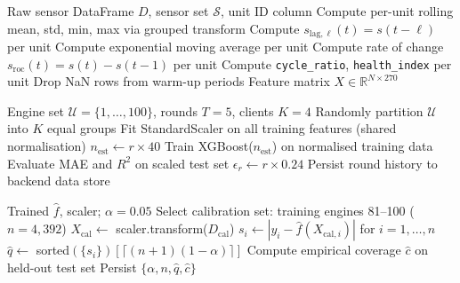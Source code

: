 \documentclass[10pt, journal, letterpaper]{IEEEtran}
\begin{document}
\begin{algorithm}[H]
\caption{Feature Engineering Pipeline}
\begin{algorithmic}[1]
\REQUIRE Raw sensor DataFrame $D$, sensor set $\mathcal{S}$, unit ID column
    \STATE Compute per-unit rolling mean, std, min, max via grouped transform
  \ENDFOR
    \STATE Compute $s_{\mathrm{lag},\ell}(t) = s(t-\ell)$ per unit
  \ENDFOR
    \STATE Compute exponential moving average per unit
  \ENDFOR
  \STATE Compute rate of change $s_\mathrm{roc}(t) = s(t)-s(t-1)$ per unit
\ENDFOR
\STATE Compute \texttt{cycle\_ratio}, \texttt{health\_index} per unit
\STATE Drop NaN rows from warm-up periods
\RETURN Feature matrix $X \in \mathbb{R}^{N \times 270}$
\end{algorithmic}
\end{algorithm}

\begin{algorithm}[H]
\caption{Federated Training Simulation}
\begin{algorithmic}[1]
\REQUIRE Engine set $\mathcal{U}=\{1,\ldots,100\}$, rounds $T=5$, clients $K=4$
\STATE Randomly partition $\mathcal{U}$ into $K$ equal groups
\STATE Fit StandardScaler on all training features (shared normalisation)
  \STATE $n_\mathrm{est} \leftarrow r \times 40$
  \STATE Train XGBoost($n_\mathrm{est}$) on normalised training data
  \STATE Evaluate MAE and $R^2$ on scaled test set
  \STATE $\epsilon_r \leftarrow r \times 0.24$
\ENDFOR
\STATE Persist round history to backend data store
\end{algorithmic}
\end{algorithm}

\begin{algorithm}[H]
\caption{Split Conformal Calibration}
\begin{algorithmic}[1]
\REQUIRE Trained $\hat{f}$, scaler; $\alpha = 0.05$
\STATE Select calibration set: training engines 81--100 ($n = 4{,}392$)
\STATE $X_\mathrm{cal} \leftarrow$ scaler.transform($D_\mathrm{cal}$)
\STATE $s_i \leftarrow |y_i - \hat{f}(X_{\mathrm{cal},i})|$ for $i=1,\ldots,n$
\STATE $\hat{q} \leftarrow$ sorted$(\{s_i\})[\lceil(n+1)(1-\alpha)\rceil]$
\STATE Compute empirical coverage $\hat{c}$ on held-out test set
\STATE Persist $\{\alpha, n, \hat{q}, \hat{c}\}$
\end{algorithmic}
\end{algorithm}
\end{document}
